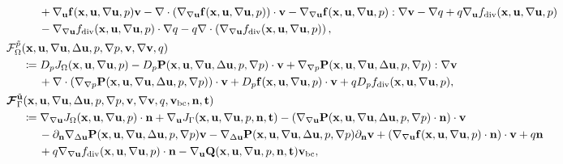 \documentclass[oneside]{book}
\numberwithin{equation}{section}
\begin{document}
\begin{itemize}[leftmargin=0in]
\begin{align*}
        &\hspace{1cm}+ \nabla_{\bf u}{\bf f}({\bf x},{\bf u},\nabla{\bf u},p){\bf v} - \nabla\cdot\left(\nabla_{\nabla{\bf u}}{\bf f}({\bf x},{\bf u},\nabla{\bf u},p)\right)\cdot{\bf v} - \nabla_{\nabla{\bf u}}{\bf f}({\bf x},{\bf u},\nabla{\bf u},p):\nabla{\bf v} - \nabla q + q\nabla_{\bf u}f_{\rm div}({\bf x},{\bf u},\nabla{\bf u},p)\\
        &\hspace{1cm}- \nabla_{\nabla{\bf u}}f_{\rm div}({\bf x},{\bf u},\nabla{\bf u},p)\cdot\nabla q - q\nabla\cdot\left(\nabla_{\nabla{\bf u}}f_{\rm div}({\bf x},{\bf u},\nabla{\bf u},p)\right),\\
        &\mathcal{F}_\Omega^{\tilde{p}}({\bf x},{\bf u},\nabla{\bf u},\Delta{\bf u},p,\nabla p,{\bf v},\nabla{\bf v},q)\\
        &\hspace{5mm}\coloneqq D_pJ_\Omega({\bf x},{\bf u},\nabla{\bf u},p) - D_p{\bf P}({\bf x},{\bf u},\nabla{\bf u},\Delta{\bf u},p,\nabla p)\cdot{\bf v} + \nabla_{\nabla p}{\bf P}({\bf x},{\bf u},\nabla{\bf u},\Delta{\bf u},p,\nabla p):\nabla{\bf v}\\
        &\hspace{1cm} + \nabla\cdot\left(\nabla_{\nabla p}{\bf P}({\bf x},{\bf u},\nabla{\bf u},\Delta{\bf u},p,\nabla p)\right)\cdot{\bf v} + D_p{\bf f}({\bf x},{\bf u},\nabla{\bf u},p)\cdot{\bf v} + qD_pf_{\rm div}({\bf x},{\bf u},\nabla{\bf u},p),\\
        &\boldsymbol{\mathcal{F}}_\Gamma^{\tilde{\bf u}}({\bf x},{\bf u},\nabla{\bf u},\Delta{\bf u},p,\nabla p,{\bf v},\nabla{\bf v},q,{\bf v}_{\rm bc},{\bf n},{\bf t})\\
        &\hspace{5mm}\coloneqq\nabla_{\nabla{\bf u}}J_\Omega({\bf x},{\bf u},\nabla{\bf u},p)\cdot{\bf n} + \nabla_{\bf u}J_\Gamma({\bf x},{\bf u},\nabla{\bf u},p,{\bf n},{\bf t}) - \left(\nabla_{\nabla{\bf u}}{\bf P}({\bf x},{\bf u},\nabla{\bf u},\Delta{\bf u},p,\nabla p)\cdot{\bf n}\right)\cdot{\bf v}\\
        &\hspace{1cm} - \partial_{\bf n}\nabla_{\Delta{\bf u}}{\bf P}({\bf x},{\bf u},\nabla{\bf u},\Delta{\bf u},p,\nabla p){\bf v} - \nabla_{\Delta{\bf u}}{\bf P}({\bf x},{\bf u},\nabla{\bf u},\Delta{\bf u},p,\nabla p)\partial_{\bf n}{\bf v} + \left(\nabla_{\nabla{\bf u}}{\bf f}({\bf x},{\bf u},\nabla{\bf u},p)\cdot{\bf n}\right)\cdot{\bf v} + q{\bf n}\\
        &\hspace{1cm} + q\nabla_{\nabla{\bf u}}f_{\rm div}({\bf x},{\bf u},\nabla{\bf u},p)\cdot{\bf n} - \nabla_{\bf u}{\bf Q}({\bf x},{\bf u},\nabla{\bf u},p,{\bf n},{\bf t}){\bf v}_{\rm bc},\\

\end{align*}
\end{itemize}
\end{document}
